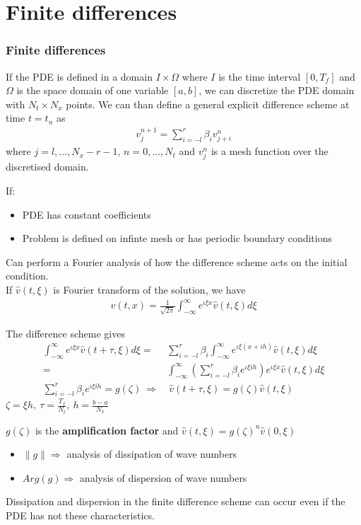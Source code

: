 \documentclass{beamer}
\begin{document}
\section{Finite differences}
\begin{frame}
\frametitle{Finite differences}
If the PDE is defined in a domain $I \times \Omega$ where $I$ is the time interval $[0, T_f]$ and $\Omega$ is the space domain of one variable $[a,b]$, we can discretize the PDE domain with $N_t \times N_x$ points. We can than define a general explicit difference scheme at time $t = t_n$ as
\begin{align*}
v_j^{n+1} = \sum_{i = -l}^r \beta_i v_{j+i}^n
\end{align*}
where $j = l, ..., N_x - r -1$, $n = 0, ..., N_t$ and $v_j^n$ is a mesh function over the discretised domain.
\end{frame}
\begin{frame}
If: \begin{itemize}
\item PDE has constant coefficients
\item Problem is defined on infinte mesh or has periodic boundary conditions
\end{itemize}
Can perform a Fourier analysis of how the difference scheme acts on the initial condition. \\ If $\hat{v}(t,\xi)$ is Fourier transform of the solution, we have
\begin{align*}
v(t,x) = \frac{1}{\sqrt{2\pi}}\int_{-\infty}^{\infty}e^{\iota\xi x}\hat{v}(t,\xi)d\xi
\end{align*}
\end{frame}
\begin{frame}
The difference scheme gives
\begin{align*}
\int_{-\infty}^{\infty}e^{\iota\xi x}\hat{v}(t + \tau,\xi)d\xi = & \sum_{i=-l}^{r}\beta_i\int_{-\infty}^{\infty}e^{\iota\xi (x + ih)}\hat{v}(t,\xi)d\xi \\
= & \int_{-\infty}^{\infty} \left(\sum_{i=-l}^{r}\beta_i e^{\iota\xi ih}\right) e^{\iota \xi x}\hat{v}(t,\xi)d\xi \\
\sum_{i=-l}^{r}\beta_i e^{\iota\xi ih} = g(\zeta) \ \Rightarrow & \ \hat{v}(t + \tau, \xi) = g(\zeta)\hat{v}(t,\xi)
\end{align*}
$\zeta = \xi h, \ \tau = \frac{T_f}{N_t}, \ h = \frac{b - a}{N_x}$
\end{frame}
\begin{frame}
$g(\zeta)$ is the \textbf{amplification factor} and $\hat{v}(t,\xi) = g(\zeta)^n\hat{v}(0,\xi)$
\begin{itemize}
\item $\|g\| \Rightarrow$ analysis of dissipation of wave numbers
\item $Arg(g) \Rightarrow$ analysis of dispersion of wave numbers
\end{itemize}
Dissipation and dispersion in the finite difference scheme can occur even if the PDE has not these characteristics.
\end{frame}
\end{document}
